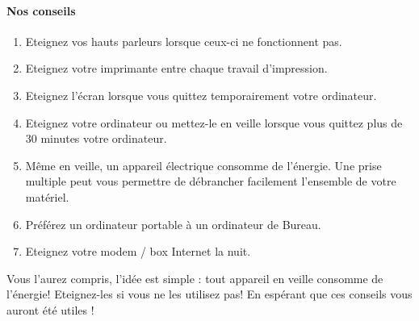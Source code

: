 \documentclass[a4paper,11pt,french]{article}
\begin{document}
\paragraph{Nos conseils}
\begin{enumerate}
\item Eteignez vos hauts parleurs lorsque ceux-ci ne fonctionnent pas.
\item Eteignez votre imprimante entre chaque travail d'impression.
\item Eteignez l'écran lorsque vous quittez temporairement votre ordinateur.
\item Eteignez votre ordinateur ou mettez-le en veille lorsque vous quittez plus de 30 minutes votre ordinateur.
\item Même en veille, un appareil électrique consomme de l'énergie. Une prise multiple peut vous permettre de débrancher facilement l'ensemble de votre matériel.
\item Préférez un ordinateur portable à un ordinateur de Bureau.
\item Eteignez votre modem / box Internet la nuit.
\end{enumerate}

Vous l'aurez compris, l'idée est simple : tout appareil en veille consomme de l'énergie! Eteignez-les si vous ne les utilisez pas!
En espérant que ces conseils vous auront été utiles !
\end{document}
